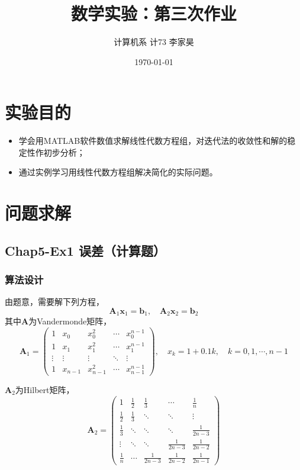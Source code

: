 \documentclass[12pt,a4paper]{article}
\title{数学实验：第三次作业}
\author{计算机系 \quad 计73 \quad 2017011620 \quad 李家昊}
\date{\today}
\begin{document}
\maketitle

\section{实验目的}

\begin{itemize}
    \item 学会用MATLAB软件数值求解线性代数方程组，对迭代法的收敛性和解的稳定性作初步分析；
    \item 通过实例学习用线性代数方程组解决简化的实际问题。
\end{itemize}

\section{问题求解}

\subsection{Chap5-Ex1 误差（计算题）}

\subsubsection{算法设计}

由题意，需要解下列方程，
\begin{equation}\label{eq:ex1_model}
    \boldsymbol{A}_1 \boldsymbol{x}_1 = \boldsymbol{b}_1, \quad \boldsymbol{A}_2 \boldsymbol{x}_2 = \boldsymbol{b}_2
\end{equation}
其中$\boldsymbol{A}$为Vandermonde矩阵，
\begin{equation}
    \boldsymbol{A}_1 = \left(
    \begin{matrix}
        1      & x_0    & x_0^2     & \cdots & x_0^{n-1} \\
        1      & x_1    & x_1^2     & \cdots & x_1^{n-1} \\
        \vdots & \vdots & \vdots    & \ddots & \vdots     \\
        1      & x_{n-1}& x_{n-1}^2 & \cdots & x_{n-1}^{n-1}
    \end{matrix}    
    \right),
    \quad 
    x_k = 1+0.1k, \quad k=0,1,\cdots,n-1
\end{equation}

$\boldsymbol{A}_2$为Hilbert矩阵，
\begin{equation}
    \boldsymbol{A}_2 = \left(
    \begin{matrix}
        1 & \frac{1}{2} & \frac{1}{3} & \cdots & \frac{1}{n} \\
        \frac{1}{2} & \frac{1}{3} & \ddots & \ddots & \vdots \\
        \frac{1}{3} & \ddots & \ddots & \ddots & \frac{1}{2n-3} \\
        \vdots & \ddots & \ddots & \frac{1}{2n-3} & \frac{1}{2n-2}\\
        \frac{1}{n} & \cdots & \frac{1}{2n-3} & \frac{1}{2n-2} & \frac{1}{2n-1}
    \end{matrix}
    \right)
\end{equation}
\end{document}
